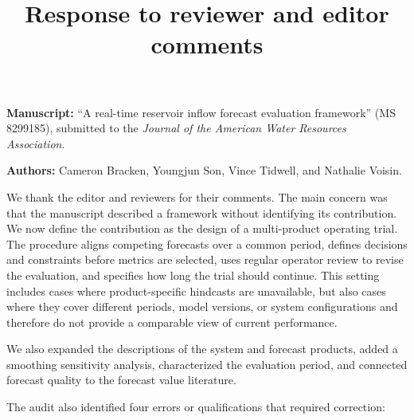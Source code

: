 \documentclass[11pt]{article}
\title{\vspace{-2em}Response to reviewer and editor comments}
\author{}
\date{}
\begin{document}
\maketitle
\vspace{-4em}

\noindent\textbf{Manuscript:} ``A real-time reservoir inflow forecast evaluation
framework'' (MS 8299185), submitted to the \emph{Journal of the American Water
Resources Association}.

\noindent\textbf{Authors:} Cameron Bracken, Youngjun Son, Vince Tidwell, and Nathalie Voisin.

\vspace{0.4em}

We thank the editor and reviewers for their comments. The main concern was that the
manuscript described a framework without identifying its contribution. We now define the
contribution as the design of a multi-product operating trial. The procedure aligns competing
forecasts over a common period, defines decisions and constraints before metrics are selected,
uses regular operator review to revise the evaluation, and specifies how long the trial should
continue. This setting includes cases where product-specific hindcasts are unavailable, but also
cases where they cover different periods, model versions, or system configurations and therefore
do not provide a comparable view of current performance.

We also expanded the descriptions of the system and forecast products, added a smoothing
sensitivity analysis, characterized the evaluation period, and connected forecast quality
to the forecast value literature.

The audit also identified four errors or qualifications that required correction:
\end{document}
